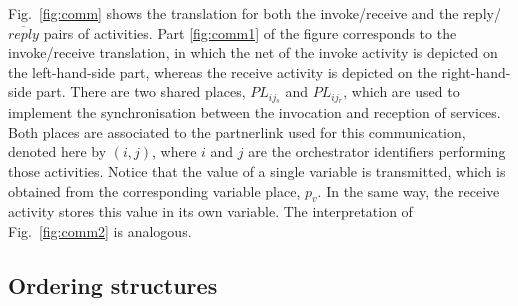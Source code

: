 \begin{itemize}
Fig.~\ref{fig:comm} shows the translation for both the invoke/receive and the reply/$\overline{reply}$ pairs of activities. Part \ref{fig:comm1} of the figure corresponds to the invoke/receive translation, in which the net of the invoke activity is depicted on the left-hand-side part, whereas the receive activity is depicted on the right-hand-side part. There are two shared places, $PL_{ij{_s}}$ and $PL_{ij{_r}}$, which are used to implement the synchronisation between the invocation and reception of services. Both places are associated to the partnerlink used for this communication, denoted here by $(i,j)$, where $i$ and $j$ are the orchestrator identifiers performing those activities. Notice that the value of a single variable is transmitted, which is obtained from the corresponding variable place, $p_v$. In the same way, the receive activity stores this value in its own variable. The interpretation of Fig.~\ref{fig:comm2} is analogous.  
\end{itemize}
%
\subsection{Ordering structures}

